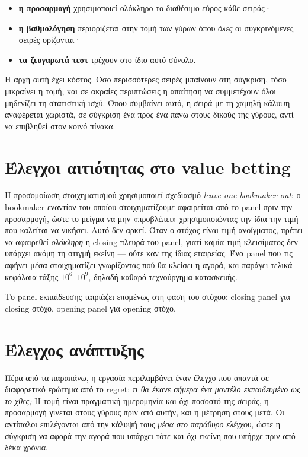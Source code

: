 \documentclass[12pt,a4paper,oneside]{report}
\renewcommand{\_}{\oldunderscore\allowbreak}
\theoremstyle{definition}
\theoremstyle{plain}
\theoremstyle{remark}
\begin{document}
\begin{itemize}
  \item \textbf{η προσαρμογή} χρησιμοποιεί ολόκληρο το διαθέσιμο εύρος κάθε σειράς·
  \item \textbf{η βαθμολόγηση} περιορίζεται στην τομή των γύρων όπου \emph{όλες} οι
        συγκρινόμενες σειρές ορίζονται·
  \item \textbf{τα ζευγαρωτά τεστ} τρέχουν στο ίδιο αυτό σύνολο.
\end{itemize}

Η αρχή αυτή έχει κόστος. Όσο περισσότερες σειρές μπαίνουν στη σύγκριση, τόσο μικραίνει η
τομή, και σε ακραίες περιπτώσεις η απαίτηση να συμμετέχουν όλοι μηδενίζει τη στατιστική
ισχύ. Όπου συμβαίνει αυτό, η σειρά με τη χαμηλή κάλυψη αναφέρεται χωριστά, σε σύγκριση ένα
προς ένα πάνω στους δικούς της γύρους, αντί να επιβληθεί στον κοινό πίνακα.

\section{Έλεγχοι αιτιότητας στο value betting}

Η προσομοίωση στοιχηματισμού χρησιμοποιεί σχεδιασμό \emph{leave-one-bookmaker-out}: ο
bookmaker εναντίον του οποίου στοιχηματίζουμε αφαιρείται από το panel πριν την προσαρμογή,
ώστε το μείγμα να μην «προβλέπει» χρησιμοποιώντας την ίδια την τιμή που καλείται να
νικήσει. Αυτό δεν αρκεί. Όταν ο στόχος είναι τιμή ανοίγματος, πρέπει να αφαιρεθεί
\emph{ολόκληρη} η closing πλευρά του panel, γιατί καμία τιμή κλεισίματος δεν υπάρχει ακόμη
τη στιγμή εκείνη --- ούτε καν της ίδιας εταιρείας. Ένα panel που τις αφήνει μέσα
στοιχηματίζει γνωρίζοντας πού θα κλείσει η αγορά, και παράγει τελικά κεφάλαια τάξης
$10^6$--$10^9$, δηλαδή καθαρό τεχνούργημα κατασκευής.

Το panel εκπαίδευσης ταιριάζει επομένως στη φάση του στόχου: closing panel για closing
στόχο, opening panel για opening στόχο.

\section{Έλεγχος ανάπτυξης}

Πέρα από τα παραπάνω, η εργασία περιλαμβάνει έναν έλεγχο που απαντά σε διαφορετικό ερώτημα
από το regret: \emph{τι θα έκανε σήμερα ένα μοντέλο εκπαιδευμένο ως το χθες;} Η τομή είναι
πραγματική ημερομηνία και όχι ποσοστό της σειράς, η προσαρμογή γίνεται στους γύρους πριν από
αυτήν, και η μέτρηση στους μετά. Οι αντίπαλοι επιλέγονται από την κάλυψή τους \emph{μέσα στο
παράθυρο ελέγχου}, ώστε η σύγκριση να αφορά την αγορά που υπάρχει τότε και όχι εκείνη που
υπήρχε πριν από δέκα χρόνια.
\end{document}
